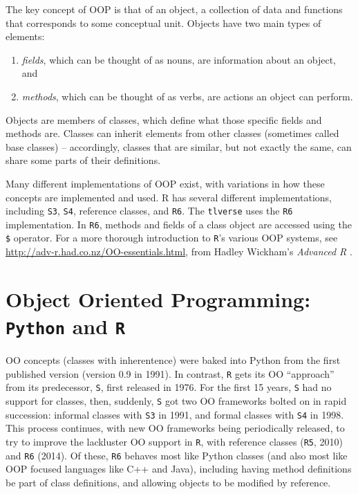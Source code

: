 \documentclass[12pt, krantz2,]{krantz}
\newcommand{\passthrough}[1]{#1}
\providecommand{\tightlist}{%
  \setlength{\itemsep}{0pt}\setlength{\parskip}{0pt}}
\theoremstyle{definition}
\theoremstyle{definition}
\theoremstyle{definition}
\newcommand{\1}{\mathbbm{1}}
\begin{document}
The key concept of OOP is that of an object, a collection of data and functions
that corresponds to some conceptual unit. Objects have two main types of
elements:

\begin{enumerate}
\def\labelenumi{\arabic{enumi}.}
\tightlist
\item
  \emph{fields}, which can be thought of as nouns, are information about an object,
  and
\item
  \emph{methods}, which can be thought of as verbs, are actions an object can
  perform.
\end{enumerate}

Objects are members of classes, which define what those specific fields and
methods are. Classes can inherit elements from other classes (sometimes called
base classes) -- accordingly, classes that are similar, but not exactly the
same, can share some parts of their definitions.

Many different implementations of OOP exist, with variations in how these
concepts are implemented and used. R has several different implementations,
including \passthrough{\lstinline!S3!}, \passthrough{\lstinline!S4!}, reference classes, and \passthrough{\lstinline!R6!}. The \passthrough{\lstinline!tlverse!} uses the \passthrough{\lstinline!R6!}
implementation. In \passthrough{\lstinline!R6!}, methods and fields of a class object are accessed using
the \passthrough{\lstinline!$!} operator. For a more thorough introduction to \passthrough{\lstinline!R!}'s various OOP systems,
see \url{http://adv-r.had.co.nz/OO-essentials.html}, from Hadley Wickham's \emph{Advanced
R} \citep{wickham2014advanced}.

\hypertarget{object-oriented-programming-python-and-r}{%
\section{\texorpdfstring{Object Oriented Programming: \texttt{Python} and \texttt{R}}{Object Oriented Programming: Python and R}}\label{object-oriented-programming-python-and-r}}

OO concepts (classes with inherentence) were baked into Python from the first
published version (version 0.9 in 1991). In contrast, \passthrough{\lstinline!R!} gets its OO ``approach''
from its predecessor, \passthrough{\lstinline!S!}, first released in 1976. For the first 15 years, \passthrough{\lstinline!S!}
had no support for classes, then, suddenly, \passthrough{\lstinline!S!} got two OO frameworks bolted on
in rapid succession: informal classes with \passthrough{\lstinline!S3!} in 1991, and formal classes with
\passthrough{\lstinline!S4!} in 1998. This process continues, with new OO frameworks being periodically
released, to try to improve the lackluster OO support in \passthrough{\lstinline!R!}, with reference
classes (\passthrough{\lstinline!R5!}, 2010) and \passthrough{\lstinline!R6!} (2014). Of these, \passthrough{\lstinline!R6!} behaves most like Python
classes (and also most like OOP focused languages like C++ and Java), including
having method definitions be part of class definitions, and allowing objects to
be modified by reference.



\backmatter
\printindex
\end{document}
